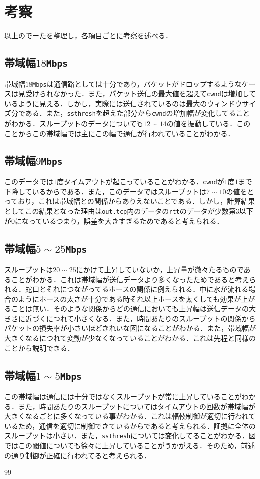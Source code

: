 \documentclass[paper=a4, fontsize=10pt]{jlreq}
\begin{document}
\newpage

\section{考察}
以上のでーたを整理し，各項目ごとに考察を述べる．
\subsection{帯域幅$18$\texttt{Mbps}}
帯域幅$18$\texttt{Mbps}は通信路としては十分であり，パケットがドロップするようなケースは見受けられなかった．また，パケット送信の最大値を超えて\texttt{cwnd}は増加しているように見える．しかし，実際には送信されているのは最大のウィンドウサイズ分である．また，\texttt{ssthresh}を超えた部分から\texttt{cwnd}の増加幅が変化してることがわかる．スループットのデータについても$12 \sim 14$の値を振動している．このことからこの帯域幅では主にこの幅で通信が行われていることがわかる．
\subsection{帯域幅$9$\texttt{Mbps}}
このデータでは$1$度タイムアウトが起こっていることがわかる．\texttt{cwnd}が$1$度$1$まで下降しているからである．また，このデータではスループットは$7 \sim 10$の値をとっており，これは帯域幅との関係からありえないことである．しかし，計算結果としてこの結果となった理由は\texttt{out.tcp}内のデータの\texttt{rtt}のデータが少数第$3$以下が$0$になっているつまり，誤差を大きすぎるためであると考えられる．
\subsection{帯域幅$5 \sim 25$\texttt{Mbps}}
スループットは$20 \sim 25$にかけて上昇していないか，上昇量が微々たるものであることがわかる．これは帯域幅が送信データより多くなったためであると考えられる．蛇口とそれにつながってるホースの関係に例えられる．中に水が流れる場合のようにホースの太さが十分である時それ以上ホースを太くしても効果が上がることは無い．そのような関係からどの通信においても上昇幅は送信データの大きさに近づくにつれて小さくなる．また，時間あたりのスループットの関係からパケットの損失率が小さいほどきれいな図になることがわかる．また，帯域幅が大きくなるにつれて変動が少なくなっていることがわかる．これは先程と同様のことから説明できる．

\subsection{帯域幅$1 \sim 5$\texttt{Mbps}}
この帯域幅は通信には十分ではなくスループットが常に上昇していることがわかる．また，時間あたりのスループットについてはタイムアウトの回数が帯域幅が大きくなるごとに多くなっている事がわかる．これは輻輳制御が適切に行われているため，通信を適切に制御できているからであると考えられる．証拠に全体のスループットは小さい．また，\texttt{ssthresh}については変化してることがわかる．図ではこの閾値についても徐々に上昇していることがうかがえる．そのため，前述の通り制御が正確に行われてると考えられる．

\begin{thebibliography}{99}
  \bibitem{}
\end{thebibliography}
\end{document}
